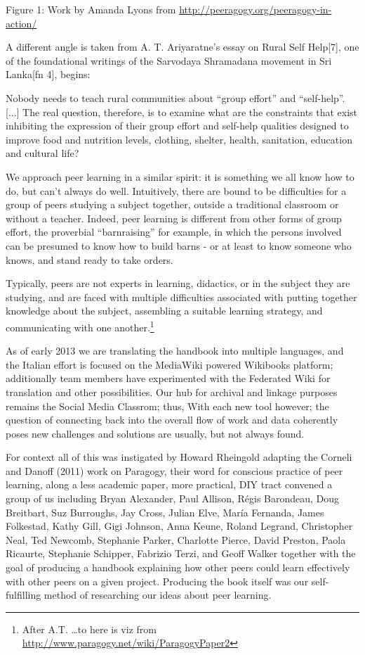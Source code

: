 \documentclass[twoside]{article}
\begin{document}
\begin{multicols}{2}
Figure 1: Work by Amanda Lyons from \url{http://peeragogy.org/peeragogy-in-action/}

A different angle is taken from A. T. Ariyaratne's essay on Rural Self Help[7], one of the foundational writings of the Sarvodaya Shramadana movement in Sri Lanka[fn 4], begins:

Nobody needs to teach rural communities about ``group effort'' and ``self-help''. [...] The real question, therefore, is to examine what are the constraints that exist inhibiting the expression of their group effort and self-help qualities designed to improve food and nutrition levels, clothing, shelter, health, sanitation, education and cultural life?

We approach peer learning in a similar spirit: it is something we all know how to do, but can't always do well. Intuitively, there are bound to be difficulties for a group of peers studying a subject together, outside a traditional classroom or without a teacher. Indeed, peer learning is different from other forms of group effort, the proverbial ``barnraising'' for example, in which the persons involved can be presumed to know how to build barns - or at least to know someone who knows, and stand ready to take orders.

Typically, peers are not experts in learning, didactics, or in the subject they are studying, and are faced with multiple difficulties associated with putting together knowledge about the subject, assembling a suitable learning strategy, and communicating with one another.\footnote{After A.T. \ldots to here is viz from \url{http://www.paragogy.net/wiki/ParagogyPaper2}}

As of early 2013 we are translating the handbook into multiple languages, and the Italian effort is focused on the MediaWiki powered Wikibooks platform; additionally team members have experimented with the Federated Wiki for translation and other possibilities. Our hub for archival and linkage purposes remains the Social Media Classrom; thus, With each new tool however; the question of connecting back into the overall flow of work and data coherently poses new challenges and solutions are usually, but not always found.

For context all of this was instigated by Howard Rheingold adapting the Corneli and Danoff (2011) work on Paragogy, their word for conscious practice of peer learning, along a less academic paper, more practical, DIY tract convened a group of us including Bryan Alexander, Paul Allison, R\'egis Barondeau, Doug Breitbart, Suz Burroughs, Jay Cross, Julian Elve, Mar\'ia Fernanda, James Folkestad, Kathy Gill, Gigi Johnson, Anna Keune, Roland Legrand, Christopher Neal, Ted Newcomb, Stephanie Parker, Charlotte Pierce, David Preston, Paola Ricaurte, Stephanie Schipper, Fabrizio Terzi, and Geoff Walker together with the goal of producing a handbook explaining how other peers could learn effectively with other peers on a given project. Producing the book itself was our self-fulfilling method of researching our ideas about peer learning.


\end{multicols}
\end{document}
